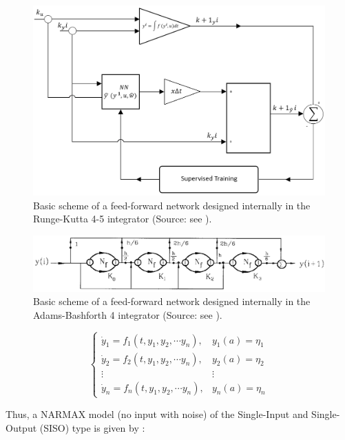 \documentclass[journal,article,submit,pdftex,moreauthors]{Definitions/mdpi}
\begin{document}
\begin{figure}[htb]
\centering
\includegraphics[scale=0.24]{Definitions/figure4.png}
\caption{Basic scheme of a feed-forward network designed internally in the Runge-Kutta 4-5 integrator (Source: see \cite{ref11}).}
\label{fig4}
\end{figure}

\begin{figure}[htb]
\centering
\includegraphics[scale=0.55]{Definitions/figure5.png}
\caption{Basic scheme of a feed-forward network designed internally in the Adams-Bashforth 4 integrator (Source: see \cite{ref12}).}
\label{fig5}
\end{figure}

\begin{equation}
	\left\{\begin{matrix}
		\dot{y}_1= f_1(t, y_1, y_2, \cdots y_n), & y_1(a)=\eta _1 \\
 		\dot{y}_2= f_2(t, y_1, y_2, \cdots y_n), & y_2(a)=\eta _2 \\
 		\vdots & \vdots \\
 		\dot{y}_n= f_n(t, y_1, y_2, \cdots y_n), & y_n(a)=\eta _n 
	\end{matrix}\right.	
	\label{eq:1}
 \end{equation}

Thus, a NARMAX model (no input with noise) of the Single-Input and Single-Output (SISO) type is given by \cite{ref5, ref6}:
\end{document}
